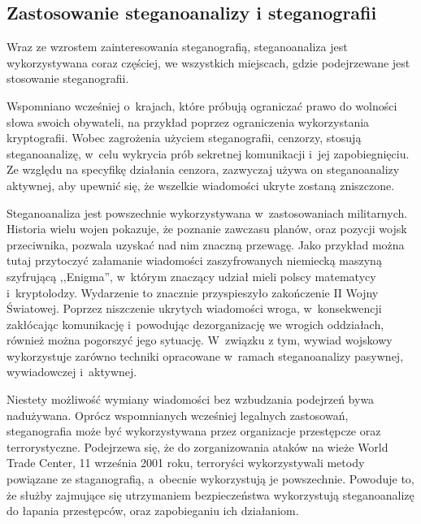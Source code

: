\documentclass[a4paper, twoside, openright, 12pt]{report}
\begin{document}
        \subsection{Zastosowanie steganoanalizy i steganografii}
        Wraz ze wzrostem zainteresowania steganografią, steganoanaliza jest wykorzystywana
        coraz częściej, we wszystkich miejscach, gdzie podejrzewane jest stosowanie
        steganografii.

        Wspomniano wcześniej o~krajach, które próbują ograniczać
        prawo do wolności słowa swoich obywateli, na przykład poprzez ograniczenia
        wykorzystania kryptografii. Wobec zagrożenia użyciem steganografii, cenzorzy,
        stosują steganoanalizę, w~celu wykrycia prób sekretnej komunikacji i~jej zapobiegnięciu.
        Ze względu na specyfikę działania cenzora, zazwyczaj używa on steganoanalizy
        aktywnej, aby upewnić się, że wszelkie wiadomości ukryte zostaną zniszczone.

        Steganoanaliza jest powszechnie wykorzystywana w~zastosowaniach militarnych.
        Historia wielu wojen pokazuje, że poznanie zawczasu planów, oraz pozycji
        wojsk przeciwnika, pozwala uzyskać nad nim znaczną przewagę. Jako przykład
        można tutaj przytoczyć załamanie wiadomości zaszyfrowanych niemiecką maszyną
        szyfrującą ,,Enigma'', w~którym znaczący udział mieli polscy matematycy i~kryptolodzy.
        Wydarzenie to znacznie przyspieszyło zakończenie II Wojny Światowej. Poprzez niszczenie ukrytych wiadomości wroga,
        w~konsekwencji zakłócając komunikację i~powodując dezorganizację we wrogich oddziałach,
        również można pogorszyć jego sytuację.
        W~związku z tym, wywiad wojskowy wykorzystuje zarówno techniki opracowane
        w~ramach steganoanalizy pasywnej, wywiadowczej i~aktywnej.

        Niestety możliwość wymiany wiadomości bez wzbudzania podejrzeń bywa nadużywana.
        Oprócz wspomnianych wcześniej legalnych zastosowań, steganografia może
        być wykorzystywana przez organizacje przestępcze oraz terrorystyczne. Podejrzewa
        się, że do zorganizowania ataków na wieże World Trade Center, 11 września 2001 roku,
        terroryści wykorzystywali metody powiązane ze staganografią, a~obecnie wykorzystują
        je powszechnie\cite{TERRORISMANDSTEGANOGRAPHY}.
        Powoduje to, że służby zajmujące się utrzymaniem bezpieczeństwa wykorzystują
        steganoanalizę do łapania przestępców, oraz zapobieganiu ich działaniom.
\end{document}
